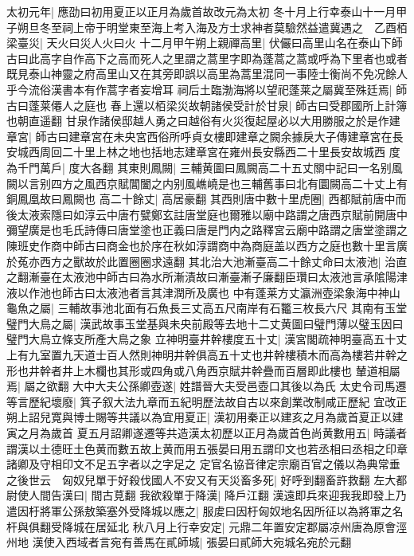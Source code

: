 太初元年|{
	應劭曰初用夏正以正月為歲首故改元為太初}
冬十月上行幸泰山十一月甲子朔旦冬至祠上帝于明堂東至海上考入海及方士求神者莫驗然益遣冀遇之　乙酉栢梁臺災|{
	天火曰災人火曰火}
十二月甲午朔上親禪高里|{
	伏儼曰高里山名在泰山下師古曰此高字自作高下之高而死人之里謂之蒿里字即為蓬蒿之蒿或呼為下里者也或者既見泰山神靈之府高里山又在其旁即誤以高里為蒿里混同一事陸士衡尚不免况餘人乎今流俗漢書本有作蒿字者妄增耳}
祠后土臨渤海將以望祀蓬莱之屬冀至殊廷焉|{
	師古曰蓬莱僊人之庭也}
春上還以栢梁災故朝諸侯受計於甘泉|{
	師古曰受郡國所上計簿也朝直遥翻}
甘泉作諸侯邸越人勇之曰越俗有火災復起屋必以大用勝服之於是作建章宮|{
	師古曰建章宮在未央宮西俗所呼貞女樓即建章之闕余據戾大子傳建章宮在長安城西周回二十里上林之地也括地志建章宮在雍州長安縣西二十里長安故城西}
度為千門萬戶|{
	度大各翻}
其東則鳳闕|{
	三輔黄圖曰鳳闕高二十五丈關中記曰一名别風闕以言别四方之風西京賦閶闔之内别風嶕嶢是也三輔舊事曰北有圜闕高二十丈上有銅鳳凰故曰鳳闕也}
高二十餘丈|{
	高居豪翻}
其西則唐中數十里虎圈|{
	西都賦前唐中而後太液索隱曰如淳云中唐冇甓鄭玄註唐堂庭也爾雅以廟中路謂之唐西京賦前開唐中彌望廣是也毛氏詩傳曰唐堂塗也正義曰唐是門内之路釋宮云廟中路謂之唐堂塗謂之陳班史作商中師古曰商金也於序在秋如淳謂商中為商庭盖以西方之庭也數十里言廣於菟亦西方之獸故於此置圈圈求遠翻}
其北治大池漸臺高二十餘丈命曰太液池|{
	治直之翻漸臺在太液池中師古曰為水所漸漬故曰漸臺漸子廉翻臣瓚曰太液池言承隂陽津液以作池也師古曰太液池者言其津潤所及廣也}
中有蓬莱方丈瀛洲壺梁象海中神山龜魚之屬|{
	三輔故事池北面有石魚長三丈高五尺南岸有石龞三枚長六尺}
其南有玉堂璧門大鳥之屬|{
	漢武故事玉堂基與未央前殿等去地十二丈黄圖曰璧門薄以璧玉因曰璧門大鳥立條支所產大鳥之象}
立神明臺井幹樓度五十丈|{
	漢宮閣疏神明臺高五十丈上有九室置九天道士百人然則神明井幹俱高五十丈也井幹樓積木而高為樓若井幹之形也井幹者井上木欄也其形或四角或八角西京賦井幹疊而百層即此樓也}
輦道相屬焉|{
	屬之欲翻}
大中大夫公孫卿壺遂|{
	姓譜晉大夫受邑壺口其後以為氏}
太史令司馬遷等言歷紀壞廢|{
	箕子叙大法九章而五紀明歷法故自古以來創業改制咸正歷紀}
宜改正朔上詔兒寛與博士賜等共議以為宜用夏正|{
	漢初用秦正以建亥之月為歲首夏正以建寅之月為歲首}
夏五月詔卿遂遷等共造漢太初歷以正月為歲首色尚黄數用五|{
	時議者謂漢以土德旺土色黄而數五故上黄而用五張晏曰用五謂印文也若丞相曰丞相之印章諸卿及守相印文不足五字者以之字足之}
定官名協音律定宗廟百官之儀以為典常垂之後世云　匈奴兒單于好殺伐國人不安又有天災畜多死|{
	好呼到翻畜許救翻}
左大都尉使人間告漢曰|{
	間古莧翻}
我欲殺單于降漢|{
	降戶江翻}
漢遠即兵來迎我我即發上乃遣因杅將軍公孫敖築塞外受降城以應之|{
	服䖍曰因杅匈奴地名因所征以為將軍之名杆與俱翻受降城在居延北}
秋八月上行幸安定|{
	元鼎二年置安定郡屬凉州唐為原會涇州地}
漢使入西域者言宛有善馬在貳師城|{
	張晏曰貳師大宛城名宛於元翻}
